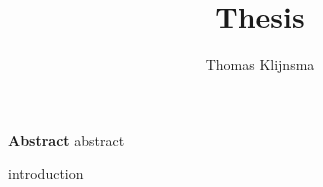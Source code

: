\documentclass[draftmode]{main}
\begin{document}
\title{Thesis}
\author{Thomas Klijnsma}
\maketitle

\textbf{Abstract}
{abstract}

{introduction}
\end{document}

